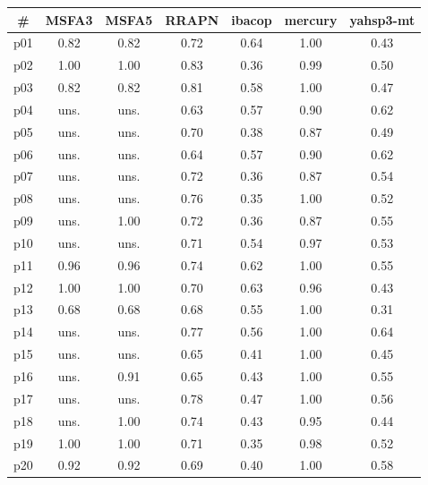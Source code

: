 \begin{tabular}{ccccccc}
\toprule
\textbf{\#} & \textbf{MSFA3} & \textbf{MSFA5} & \textbf{RRAPN} & \textbf{ibacop} & \textbf{mercury} & \textbf{yahsp3-mt}\\
\midrule
p01 & 0.82 & 0.82 & 0.72 & 0.64 & 1.00 & 0.43\\
p02 & 1.00 & 1.00 & 0.83 & 0.36 & 0.99 & 0.50\\
p03 & 0.82 & 0.82 & 0.81 & 0.58 & 1.00 & 0.47\\
p04 & uns. & uns. & 0.63 & 0.57 & 0.90 & 0.62\\
p05 & uns. & uns. & 0.70 & 0.38 & 0.87 & 0.49\\
p06 & uns. & uns. & 0.64 & 0.57 & 0.90 & 0.62\\
p07 & uns. & uns. & 0.72 & 0.36 & 0.87 & 0.54\\
p08 & uns. & uns. & 0.76 & 0.35 & 1.00 & 0.52\\
p09 & uns. & 1.00 & 0.72 & 0.36 & 0.87 & 0.55\\
p10 & uns. & uns. & 0.71 & 0.54 & 0.97 & 0.53\\
p11 & 0.96 & 0.96 & 0.74 & 0.62 & 1.00 & 0.55\\
p12 & 1.00 & 1.00 & 0.70 & 0.63 & 0.96 & 0.43\\
p13 & 0.68 & 0.68 & 0.68 & 0.55 & 1.00 & 0.31\\
p14 & uns. & uns. & 0.77 & 0.56 & 1.00 & 0.64\\
p15 & uns. & uns. & 0.65 & 0.41 & 1.00 & 0.45\\
p16 & uns. & 0.91 & 0.65 & 0.43 & 1.00 & 0.55\\
p17 & uns. & uns. & 0.78 & 0.47 & 1.00 & 0.56\\
p18 & uns. & 1.00 & 0.74 & 0.43 & 0.95 & 0.44\\
p19 & 1.00 & 1.00 & 0.71 & 0.35 & 0.98 & 0.52\\
p20 & 0.92 & 0.92 & 0.69 & 0.40 & 1.00 & 0.58\\
\bottomrule
\end{tabular}

